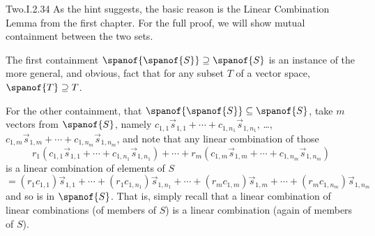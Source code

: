 \begin{ans}{Two.I.2.34}
      As the hint suggests, the basic reason is the Linear Combination Lemma
      from the first chapter.
      For the full proof, we will show mutual containment between the two sets.

      The first containment \( \spanof{ \spanof{S} }\supseteq\spanof{S}  \)
      is an instance of the more general, and obvious, fact that for any
      subset \( T \) of a vector space, \( \spanof{T}\supseteq T \).

      For the other containment,
      that \( \spanof{ \spanof{S} }\subseteq\spanof{S} \),
      take $m$ vectors from \( \spanof{S} \), namely
      \( c_{1,1}\vec{s}_{1,1}+\cdots+c_{1,n_1}\vec{s}_{1,n_1} \), \ldots,
      \( c_{1,m}\vec{s}_{1,m}+\cdots+c_{1,n_m}\vec{s}_{1,n_m} \),
      and note that any linear combination of those
      \begin{equation*}
         r_1(c_{1,1}\vec{s}_{1,1}+\cdots+c_{1,n_1}\vec{s}_{1,n_1})+\cdots
        +r_m(c_{1,m}\vec{s}_{1,m}+\cdots+c_{1,n_m}\vec{s}_{1,n_m})
      \end{equation*}
      is a linear combination of elements of \( S \)
      \begin{equation*}
        = (r_1c_{1,1})\vec{s}_{1,1}+\cdots+(r_1c_{1,n_1})\vec{s}_{1,n_1}+\cdots
        +(r_mc_{1,m})\vec{s}_{1,m}+\cdots+(r_mc_{1,n_m})\vec{s}_{1,n_m}
      \end{equation*}
      and so is in \( \spanof{S} \).
      That is, simply recall that a linear combination of linear combinations
      (of members of $S$)
      is a linear combination (again of members of $S$).
    
\end{ans}
